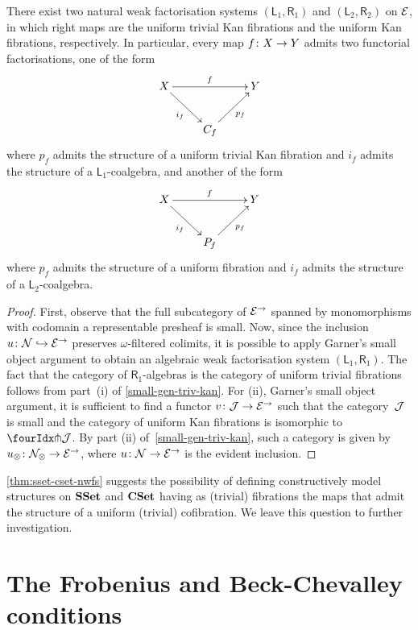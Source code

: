 \documentclass[reqno,10pt,a4paper,oneside,draft]{amsart}
\begin{document}
\begin{theorem} \label{thm:sset-cset-nwfs}
There exist two natural weak factorisation systems $(\mathsf{L}_1, \mathsf{R}_1)$ and $(\mathsf{L}_2, \mathsf{R}_2)$ on $\catE$, in which right maps are the uniform trivial Kan fibrations and the uniform Kan fibrations, respectively.
In particular, every map $f \co X \to Y$ admits two functorial factorisations, one of the form
\[
\xymatrix{
  X \ar[rr]^f \ar[dr]_{i_f} & & Y \\
  & C_f \ar[ur]_{p_f}
}
\]
where $p_f$ admits the structure of a uniform trivial Kan fibration and $i_f$ admits the structure of a $\mathsf{L}_1$-coalgebra, and another of the form
\[
\xymatrix{
X \ar[rr]^f \ar[dr]_{i_f} & & Y \\
 & P_f \ar[ur]_{p_f} }
 \]
where $p_f$ admits the structure of a uniform fibration and $i_f$ admits the structure of a $\mathsf{L}_2$-coalgebra.
\end{theorem}

\begin{proof}
First, observe that the full subcategory of $\catE^\to$ spanned by monomorphisms with codomain a representable presheaf is small.
Now, since the inclusion~$u \co \cal{N} \hookrightarrow \catE^\to$ preserves $\omega$-filtered colimits, it is possible to apply Garner's small object argument to obtain an algebraic weak factorisation system $(\mathsf{L}_1, \mathsf{R}_1)$.
The fact that the category of $\mathsf{R}_1$-algebras is the category of uniform trivial fibrations follows from part~(i) of \cref{small-gen-triv-kan}.
For (ii), Garner's small object argument, it is sufficient to find a functor $v \co \cal{J} \rightarrow \catE^\to$ such that the category~$\cal{J}$ is small and the category of uniform Kan fibrations is isomorphic to~$\liftr{\cal{J}}$.
By part (ii) of~\cref{small-gen-triv-kan}, such a category is given by $u_\otimes \co \cal{N}_\otimes \rightarrow \catE^\to$, where $u \co \cal{N} \to \catE^\to$ is the evident inclusion.
\end{proof}

\cref{thm:sset-cset-nwfs} suggests the possibility of defining constructively model structures on $\SSet$ and $\CSet$ having as (trivial) fibrations the maps that admit the structure of a uniform (trivial) cofibration.
We leave this question to further investigation.


\section{The Frobenius and Beck-Chevalley conditions}
\label{sec:frobc}
\end{document}
